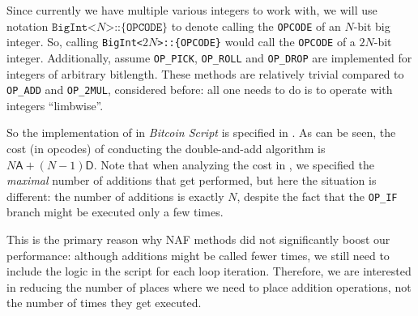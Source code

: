 \documentclass{iacrtrans}
\begin{document}
Since currently we have multiple various integers to work with, we will use notation $\texttt{BigInt<$N$>::\{OPCODE\}}$ to denote calling the \texttt{OPCODE} of an $N$-bit big integer. So, calling \texttt{BigInt<$2N$>::\{OPCODE\}} would call the \texttt{OPCODE} of a $2N$-bit integer. Additionally, assume \texttt{OP\_PICK}, \texttt{OP\_ROLL} and \texttt{OP\_DROP} are implemented for integers of arbitrary bitlength. These methods are relatively trivial compared to \texttt{OP\_ADD} and \texttt{OP\_2MUL}, considered before: all one needs to do is to operate with integers ``limbwise''.

So the implementation of  in \textit{Bitcoin Script} is specified in . As can be seen, the cost (in opcodes) of conducting the double-and-add algorithm is $N\mathsf{A}+(N-1)\mathsf{D}$. Note that when analyzing the cost in , we specified the \textit{maximal} number of additions that get performed, but here the situation is different: the number of additions is exactly $N$, despite the fact that the \texttt{OP\_IF} branch might be executed only a few times.

This is the primary reason why NAF methods did not significantly boost our performance: although additions might be called fewer times, we still need to include the logic in the script for each loop iteration. Therefore, we are interested in reducing the number of places where we need to place addition operations, not the number of times they get executed.
\end{document}
